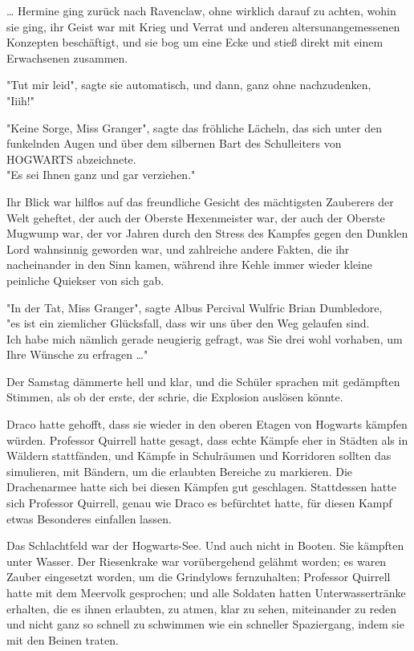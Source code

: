 {… Hermine ging zurück nach Ravenclaw, ohne wirklich darauf zu achten, wohin sie ging, ihr Geist war mit Krieg und Verrat und anderen altersunangemessenen Konzepten beschäftigt, und sie bog um eine Ecke und stieß direkt mit einem Erwachsenen zusammen.

"Tut mir leid", sagte sie automatisch, und dann, ganz ohne nachzudenken,\\ "Iiih!"

"Keine Sorge, Miss Granger", sagte das fröhliche Lächeln, das sich unter den funkelnden Augen und über dem silbernen Bart des Schulleiters von HOGWARTS abzeichnete.\\ "Es sei Ihnen ganz und gar verziehen."

Ihr Blick war hilflos auf das freundliche Gesicht des mächtigsten Zauberers der Welt geheftet, der auch der Oberste Hexenmeister war, der auch der Oberste Mugwump war, der vor Jahren durch den Stress des Kampfes gegen den Dunklen Lord wahnsinnig geworden war, und zahlreiche andere Fakten, die ihr nacheinander in den Sinn kamen, während ihre Kehle immer wieder kleine peinliche Quiekser von sich gab.

"In der Tat, Miss Granger", sagte Albus Percival Wulfric Brian Dumbledore,\\ "es ist ein ziemlicher Glücksfall, dass wir uns über den Weg gelaufen sind.\\ Ich habe mich nämlich gerade neugierig gefragt, was Sie drei wohl vorhaben, um Ihre Wünsche zu erfragen …"

Der Samstag dämmerte hell und klar, und die Schüler sprachen mit gedämpften Stimmen, als ob der erste, der schrie, die Explosion auslösen könnte.

Draco hatte gehofft, dass sie wieder in den oberen Etagen von Hogwarts kämpfen würden. Professor Quirrell hatte gesagt, dass echte Kämpfe eher in Städten als in Wäldern stattfänden, und Kämpfe in Schulräumen und Korridoren sollten das simulieren, mit Bändern, um die erlaubten Bereiche zu markieren. Die Drachenarmee hatte sich bei diesen Kämpfen gut geschlagen. Stattdessen hatte sich Professor Quirrell, genau wie Draco es befürchtet hatte, für diesen Kampf etwas Besonderes einfallen lassen.

Das Schlachtfeld war der Hogwarts-See. Und auch nicht in Booten. Sie kämpften unter Wasser. Der Riesenkrake war vorübergehend gelähmt worden; es waren Zauber eingesetzt worden, um die Grindylows fernzuhalten; Professor Quirrell hatte mit dem Meervolk gesprochen; und alle Soldaten hatten Unterwassertränke erhalten, die es ihnen erlaubten, zu atmen, klar zu sehen, miteinander zu reden und nicht ganz so schnell zu schwimmen wie ein schneller Spaziergang, indem sie mit den Beinen traten.

}
